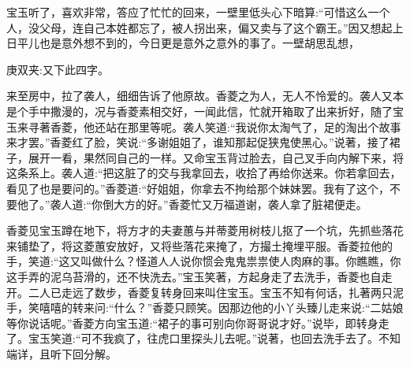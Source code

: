 \begin{parag}
    宝玉听了，喜欢非常，答应了忙忙的回来，一壁里低头心下暗算:“可惜这么一个人，没父母，连自己本姓都忘了，被人拐出来，偏又卖与了这个霸王。”因又想起上日平儿也是意外想不到的，今日更是意外之意外的事了。一壁胡思乱想，\begin{note}庚双夹:又下此四字。\end{note}来至房中，拉了袭人，细细告诉了他原故。香菱之为人，无人不怜爱的。袭人又本是个手中撒漫的，况与香菱素相交好，一闻此信，忙就开箱取了出来折好，随了宝玉来寻著香菱，他还站在那里等呢。袭人笑道:“我说你太淘气了，足的淘出个故事来才罢。”香菱红了脸，笑说:“多谢姐姐了，谁知那起促狭鬼使黑心。”说著，接了裙子，展开一看，果然同自己的一样。又命宝玉背过脸去，自己叉手向内解下来，将这条系上。袭人道:“把这脏了的交与我拿回去，收拾了再给你送来。你若拿回去，看见了也是要问的。”香菱道:“好姐姐，你拿去不拘给那个妹妹罢。我有了这个，不要他了。”袭人道:“你倒大方的好。”香菱忙又万福道谢，袭人拿了脏裙便走。
\end{parag}


\begin{parag}
    香菱见宝玉蹲在地下，将方才的夫妻蕙与并蒂菱用树枝儿抠了一个坑，先抓些落花来铺垫了，将这菱蕙安放好，又将些落花来掩了，方撮土掩埋平服。香菱拉他的手，笑道:“这又叫做什么？怪道人人说你惯会鬼鬼祟祟使人肉麻的事。你瞧瞧，你这手弄的泥乌苔滑的，还不快洗去。”宝玉笑著，方起身走了去洗手，香菱也自走开。二人已走远了数步，香菱复转身回来叫住宝玉。宝玉不知有何话，扎著两只泥手，笑嘻嘻的转来问:“什么？”香菱只顾笑。因那边他的小丫头臻儿走来说:“二姑娘等你说话呢。”香菱方向宝玉道:“裙子的事可别向你哥哥说才好。”说毕，即转身走了。宝玉笑道:“可不我疯了，往虎口里探头儿去呢。”说著，也回去洗手去了。不知端详，且听下回分解。
\end{parag}